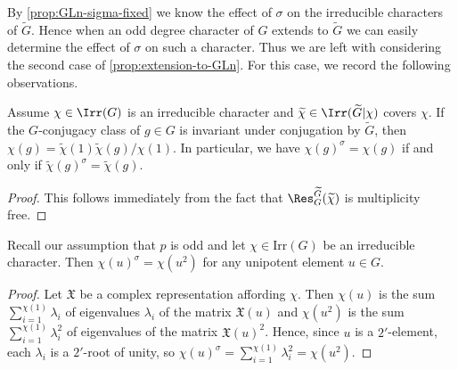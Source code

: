 \documentclass[eqthmnum, nocolour]{jt-calcs}
\newcommand{\irr}{\mathrm{Irr}}
\begin{document}
\begin{pa}
By \cref{prop:GLn-sigma-fixed} we know the effect of $\sigma$ on the irreducible characters of $\widetilde{G}$. Hence when an odd degree character of $G$ extends to $\widetilde{G}$ we can easily determine the effect of $\sigma$ on such a character. Thus we are left with considering the second case of \cref{prop:extension-to-GLn}.  For this case, we record the following observations.
\end{pa}

\begin{lemma}\label{lem:classinvariant}
Assume $\chi \in \Irr(G)$ is an irreducible character and $\widetilde{\chi} \in \Irr(\widetilde{G}| \chi)$ covers $\chi$. If the $G$-conjugacy class of $g \in G$ is invariant under conjugation by $\widetilde{G}$, then $\chi(g) = \widetilde{\chi}(1)\widetilde{\chi}(g)/\chi(1)$. In particular, we have $\chi(g)^{\sigma} = \chi(g)$ if and only if $\widetilde{\chi}(g)^{\sigma} = \widetilde{\chi}(g)$.
\end{lemma}

\begin{proof}
This follows immediately from the fact that $\Res_G^{\widetilde{G}}(\widetilde{\chi})$ is multiplicity free.
\end{proof}

\begin{lemma}\label{lem:unipsquare}
Recall our assumption that $p$ is odd and let $\chi\in\irr(G)$ be an irreducible character.  Then $\chi(u)^\sigma = \chi(u^2)$ for any unipotent element $u \in G$.
\end{lemma}

\begin{proof}
Let $\mathfrak{X}$ be a complex representation affording $\chi$.  Then $\chi(u)$ is the sum $\sum_{i=1}^{\chi(1)}\lambda_i$ of eigenvalues $\lambda_i$ of the matrix $\mathfrak{X}(u)$ and $\chi(u^2)$ is the sum $\sum_{i=1}^{\chi(1)}\lambda_i^2$ of eigenvalues of the matrix $\mathfrak{X}(u)^2$.  Hence, since $u$ is a $2'$-element, each $\lambda_i$ is a $2'$-root of unity, so $\chi(u)^\sigma=\sum_{i=1}^{\chi(1)} \lambda_i^2=\chi(u^2)$.
\end{proof}
\end{document}
